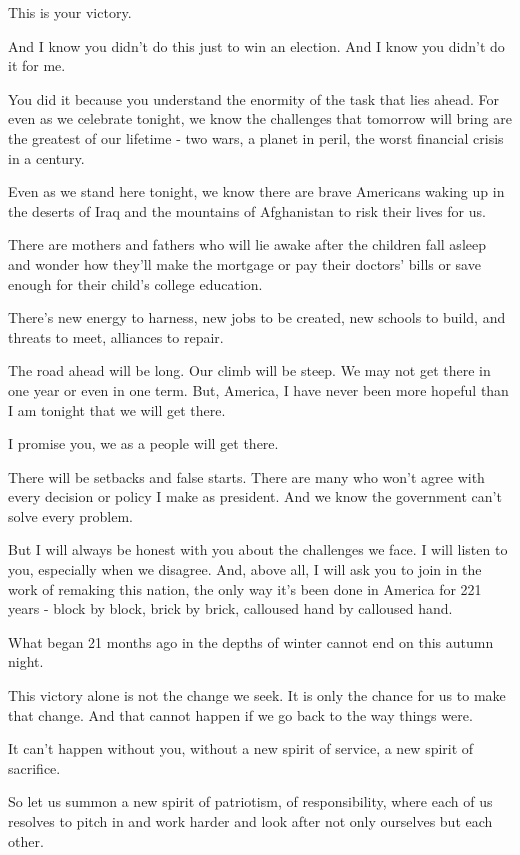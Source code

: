 \documentclass[12pt,a4paper,twocolumn]{article}
\begin{document}
This is your victory.

And I know you didn't do this just to win an election. And I know you didn't do it for me.

You did it because you understand the enormity of the task that lies ahead. For even as we celebrate tonight, we know the
challenges that tomorrow will bring are the greatest of our lifetime - two wars, a planet in peril, the worst financial
crisis in a century.

Even as we stand here tonight, we know there are brave Americans waking up in the deserts of Iraq and the mountains of
Afghanistan to risk their lives for us.

There are mothers and fathers who will lie awake after the children fall asleep and wonder how they'll make the mortgage or
pay their doctors' bills or save enough for their child's college education.

There's new energy to harness, new jobs to be created, new schools to build, and threats to meet, alliances to repair.

The road ahead will be long. Our climb will be steep. We may not get there in one year or even in one term. But, America, I
have never been more hopeful than I am tonight that we will get there.

I promise you, we as a people will get there.

There will be setbacks and false starts. There are many who won't agree with every decision or policy I make as president.
And we know the government can't solve every problem.

But I will always be honest with you about the challenges we face. I will listen to you, especially when we disagree. And,
above all, I will ask you to join in the work of remaking this nation, the only way it's been done in America for 221 years
- block by block, brick by brick, calloused hand by calloused hand.

What began 21 months ago in the depths of winter cannot end on this autumn night.

This victory alone is not the change we seek. It is only the chance for us to make that change. And that cannot happen if we
go back to the way things were.

It can't happen without you, without a new spirit of service, a new spirit of sacrifice.

So let us summon a new spirit of patriotism, of responsibility, where each of us resolves to pitch in and work harder and
look after not only ourselves but each other.
\end{document}

